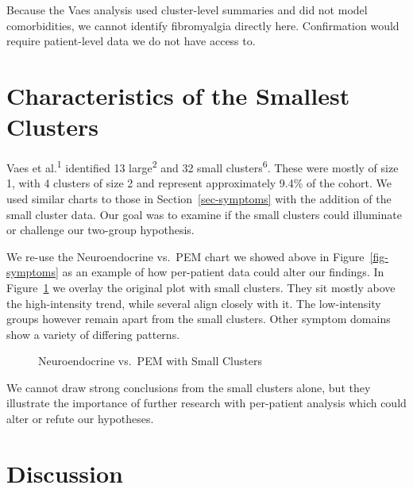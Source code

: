 \documentclass[
  letterpaper,
  DIV=11,
  numbers=noendperiod]{scrartcl}
\begin{document}
Because the Vaes analysis used cluster-level summaries and did not model
comorbidities, we cannot identify fibromyalgia directly here.
Confirmation would require patient-level data we do not have access to.

\section{Characteristics of the Smallest Clusters}\label{sec-small}

\FloatBarrier

Vaes et al.\textsuperscript{1} identified 13 large\textsuperscript{2}
and 32 small clusters\textsuperscript{6}. These were mostly of size 1,
with 4 clusters of size 2 and represent approximately 9.4\% of the
cohort. We used similar charts to those in Section~\ref{sec-symptoms}
with the addition of the small cluster data. Our goal was to examine if
the small clusters could illuminate or challenge our two-group
hypothesis.

We re-use the Neuroendocrine vs.~PEM chart we showed above in
Figure~\ref{fig-symptoms} as an example of how per-patient data could
alter our findings. In Figure~\ref{fig-smallest} we overlay the original
plot with small clusters. They sit mostly above the high-intensity
trend, while several align closely with it. The low-intensity groups
however remain apart from the small clusters. Other symptom domains show
a variety of differing patterns.

\begin{figure}[h]


\caption{\label{fig-smallest}Neuroendocrine vs.~PEM with Small Clusters}

\end{figure}%

We cannot draw strong conclusions from the small clusters alone, but
they illustrate the importance of further research with per-patient
analysis which could alter or refute our hypotheses.

\FloatBarrier

\section{Discussion}\label{sec-discuss}
\end{document}
